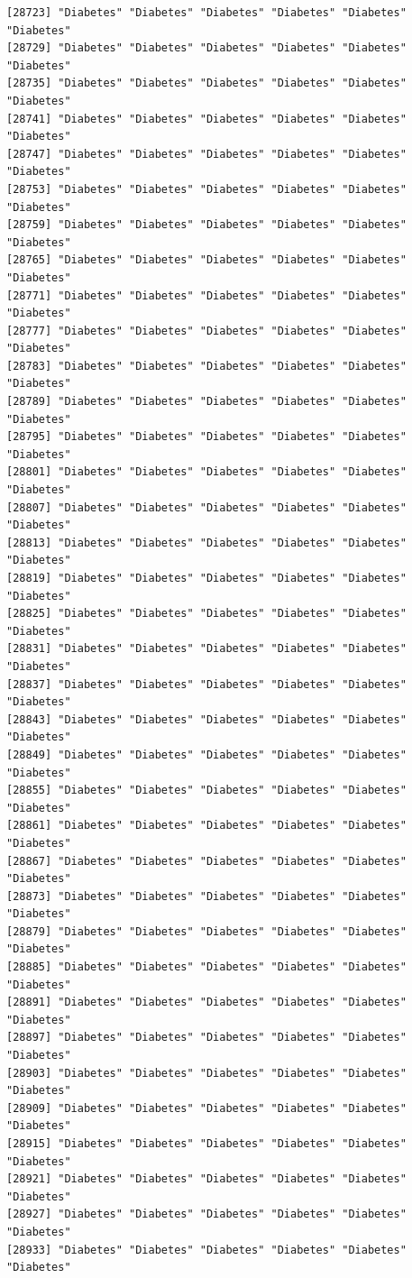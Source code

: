\documentclass[
  letterpaper,
  DIV=11,
  numbers=noendperiod]{scrartcl}
\begin{document}
\begin{verbatim}
[28723] "Diabetes" "Diabetes" "Diabetes" "Diabetes" "Diabetes" "Diabetes"
[28729] "Diabetes" "Diabetes" "Diabetes" "Diabetes" "Diabetes" "Diabetes"
[28735] "Diabetes" "Diabetes" "Diabetes" "Diabetes" "Diabetes" "Diabetes"
[28741] "Diabetes" "Diabetes" "Diabetes" "Diabetes" "Diabetes" "Diabetes"
[28747] "Diabetes" "Diabetes" "Diabetes" "Diabetes" "Diabetes" "Diabetes"
[28753] "Diabetes" "Diabetes" "Diabetes" "Diabetes" "Diabetes" "Diabetes"
[28759] "Diabetes" "Diabetes" "Diabetes" "Diabetes" "Diabetes" "Diabetes"
[28765] "Diabetes" "Diabetes" "Diabetes" "Diabetes" "Diabetes" "Diabetes"
[28771] "Diabetes" "Diabetes" "Diabetes" "Diabetes" "Diabetes" "Diabetes"
[28777] "Diabetes" "Diabetes" "Diabetes" "Diabetes" "Diabetes" "Diabetes"
[28783] "Diabetes" "Diabetes" "Diabetes" "Diabetes" "Diabetes" "Diabetes"
[28789] "Diabetes" "Diabetes" "Diabetes" "Diabetes" "Diabetes" "Diabetes"
[28795] "Diabetes" "Diabetes" "Diabetes" "Diabetes" "Diabetes" "Diabetes"
[28801] "Diabetes" "Diabetes" "Diabetes" "Diabetes" "Diabetes" "Diabetes"
[28807] "Diabetes" "Diabetes" "Diabetes" "Diabetes" "Diabetes" "Diabetes"
[28813] "Diabetes" "Diabetes" "Diabetes" "Diabetes" "Diabetes" "Diabetes"
[28819] "Diabetes" "Diabetes" "Diabetes" "Diabetes" "Diabetes" "Diabetes"
[28825] "Diabetes" "Diabetes" "Diabetes" "Diabetes" "Diabetes" "Diabetes"
[28831] "Diabetes" "Diabetes" "Diabetes" "Diabetes" "Diabetes" "Diabetes"
[28837] "Diabetes" "Diabetes" "Diabetes" "Diabetes" "Diabetes" "Diabetes"
[28843] "Diabetes" "Diabetes" "Diabetes" "Diabetes" "Diabetes" "Diabetes"
[28849] "Diabetes" "Diabetes" "Diabetes" "Diabetes" "Diabetes" "Diabetes"
[28855] "Diabetes" "Diabetes" "Diabetes" "Diabetes" "Diabetes" "Diabetes"
[28861] "Diabetes" "Diabetes" "Diabetes" "Diabetes" "Diabetes" "Diabetes"
[28867] "Diabetes" "Diabetes" "Diabetes" "Diabetes" "Diabetes" "Diabetes"
[28873] "Diabetes" "Diabetes" "Diabetes" "Diabetes" "Diabetes" "Diabetes"
[28879] "Diabetes" "Diabetes" "Diabetes" "Diabetes" "Diabetes" "Diabetes"
[28885] "Diabetes" "Diabetes" "Diabetes" "Diabetes" "Diabetes" "Diabetes"
[28891] "Diabetes" "Diabetes" "Diabetes" "Diabetes" "Diabetes" "Diabetes"
[28897] "Diabetes" "Diabetes" "Diabetes" "Diabetes" "Diabetes" "Diabetes"
[28903] "Diabetes" "Diabetes" "Diabetes" "Diabetes" "Diabetes" "Diabetes"
[28909] "Diabetes" "Diabetes" "Diabetes" "Diabetes" "Diabetes" "Diabetes"
[28915] "Diabetes" "Diabetes" "Diabetes" "Diabetes" "Diabetes" "Diabetes"
[28921] "Diabetes" "Diabetes" "Diabetes" "Diabetes" "Diabetes" "Diabetes"
[28927] "Diabetes" "Diabetes" "Diabetes" "Diabetes" "Diabetes" "Diabetes"
[28933] "Diabetes" "Diabetes" "Diabetes" "Diabetes" "Diabetes" "Diabetes"

\end{verbatim}
\end{document}
